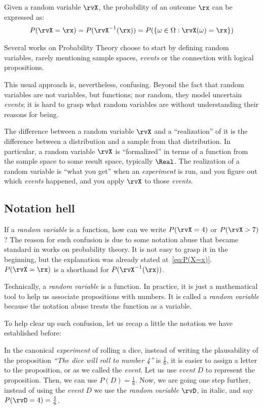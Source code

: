 Given a random variable \(\rvX\), the probability of an outcome \(\rx\) can be expressed as:
\begin{align}
	P(\rvX=\rx) = P(\rvX^{-1}(\rx)) = P(\{\omega \in \Omega: \rvX(\omega)=\rx\})\label{eq:P(X=x)} \end{align}

Several works on Probability Theory choose to start by defining random variables, rarely mentioning sample spaces, \emph{events} or the connection with logical propositions.

This usual approach is, nevertheless, confusing. Beyond the fact that random variables are not variables, but functions; nor random, they model uncertain \emph{events}; it is hard to grasp what random variables are without understanding their reasons for being.

The difference between a random variable $\rvX$ and a ``realization'' of it is the difference between a distribution and a sample from that distribution. In particular, a random variable $\rvX$ is ``formalized'' in terms of a function from the sample space to some result space, typically $\Real$. The realization of a random variable is ``what you get'' when an \emph{experiment} is run, and you figure out which \emph{events} happened, and you apply $\rvX$ to those \emph{events}.

\subsection{Notation hell} If a \emph{random variable} is a function, how can we write \(P(\rvX=4)\) or \(P(\rvX > 7)\)? The reason for such confusion is due to some notation abuse that became standard in works on probability theory. It is not easy to grasp it in the beginning, but the explanation was already stated at~\eqref{eq:P(X=x)}. \(P(\rvX=\rx)\) is a shorthand for \(P(\rvX^{-1}(\rx))\).

Technically, a \emph{random variable} is a function.  In practice, it is just a mathematical tool to help us associate propositions with numbers. It is called a \emph{random variable} because the notation abuse treats the function as a variable.

To help clear up such confusion, let us recap a little the notation we have established before:

In the canonical \emph{experiment} of rolling a dice, instead of writing the plausability of the proposition \emph{``The dice will roll to number 4''} is \(\frac{1}{6}\), it is easier to assign a letter to the proposition, or as we called the \emph{event}. Let us use \emph{event} \(D\) to represent the proposition. Then, we can use \(P(D)=\frac{1}{6}\). Now, we are going one step further, instead of using the \emph{event} \(D\) we use the \emph{random variable} \(\rvD\), in italic, and say \(P(\rvD=4)=\frac{1}{6}\).

